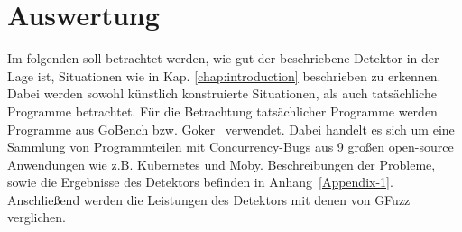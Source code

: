 \chapter{Auswertung}
Im folgenden soll betrachtet werden, wie gut der beschriebene Detektor 
in der Lage ist, Situationen wie in Kap. \ref{chap:introduction} 
beschrieben zu erkennen. Dabei werden sowohl künstlich konstruierte 
Situationen, als auch tatsächliche Programme betrachtet. Für die Betrachtung 
tatsächlicher Programme werden Programme aus GoBench bzw. Goker~\cite{gobench}
verwendet. Dabei handelt es sich um eine Sammlung von Programmteilen mit 
Concurrency-Bugs aus 9 
großen open-source Anwendungen wie z.B. Kubernetes und Moby. 
Beschreibungen der Probleme, sowie die Ergebnisse des Detektors befinden in 
Anhang~\ref{Appendix-1}.\\
Anschließend werden die Leistungen des Detektors mit denen von GFuzz verglichen.

